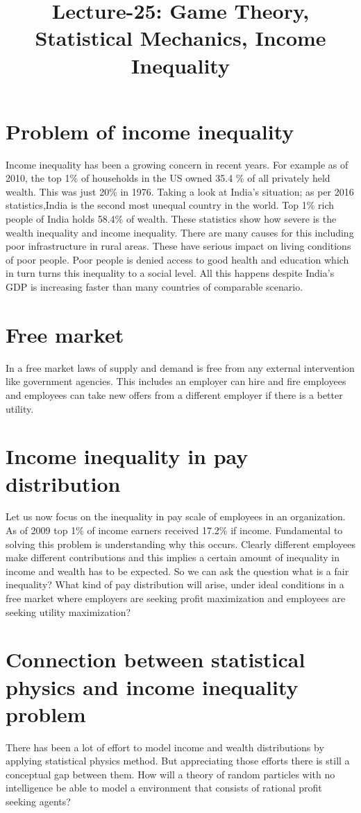 \documentclass[letterpaper,english,10pt]{article}
\title{Lecture-25: Game Theory, Statistical Mechanics, Income Inequality}
\begin{document}
\maketitle
\section{Problem of income inequality}
\cite{fairgame}
Income inequality has been a growing concern in recent years. For example as of 2010, the top 1\% of households in the US owned 35.4 \% of all privately held wealth. This was just 20\% in 1976. Taking a look at India's situation; as per 2016 statistics,India is the second most unequal country in the world. Top 1\% rich people of India holds 58.4\% of wealth. These statistics show how severe is the wealth inequality and income inequality. There are many causes for this including poor infrastructure in rural areas. These have serious impact on living conditions of poor people. Poor people is denied access to good health and education which in turn turns this inequality to a social level. All this happens despite India's GDP is increasing faster than many countries of comparable scenario.

\section{Free market}
In a free market laws of supply and demand is free from any external intervention like government agencies. This includes an employer can hire and fire employees and employees can take new offers from a different employer if there is a better utility. 

\section{Income inequality in pay distribution}
Let us now focus on  the inequality in pay scale of employees in an organization. As of 2009 top 1\% of income earners received 17.2\% if income. Fundamental to solving this problem is understanding why this occurs. Clearly different employees make different contributions and this implies a certain amount of  inequality in income and wealth has to be expected. So we can ask the question what is a fair inequality? What kind of pay distribution will arise, under ideal conditions in a free market where employers are seeking profit maximization and employees are seeking utility maximization?

\section{Connection between statistical physics and income inequality problem}
There has been a lot of effort to model income and wealth distributions by applying statistical physics method. But appreciating those efforts there is still a conceptual gap between them. How will a theory of random particles with no intelligence be able to model a environment that consists of rational profit seeking agents? 
\end{document}
